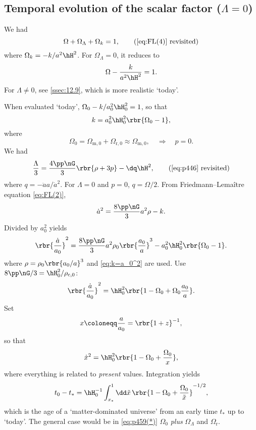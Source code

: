 \subsection{Temporal evolution of the scalar factor ($\Lambda = 0$)}
\label{ssec:12.7}
We had
\begin{equation}
\Omega + \Omega_\Lambda + \Omega_k = 1,
\tag{\ref{eq:FL(4)} revisited}
\end{equation}
where $\Omega_k = -k / a^2 \hH^2$. For $\Omega_\Lambda = 0$, it reduces to
\begin{equation}
\Omega - \frac{k}{a^2 \hH^2} = 1.
\end{equation}
For $\Lambda \neq 0$, see \cref{ssec:12.9}, which is more realistic `today'.

When evaluated `today', $\Omega_0 - k/a_0^2 \hH_0^2 = 1$, so that
\begin{equation}
k = a_0^2 \hH_0^2\rbr{\Omega_0 -1},
\label{eq:k=a_0^2}
\end{equation}
where
\begin{equation}
\Omega_0 = \Omega_{\text{m},0} + \Omega_{\text{r},0} \approx 
\Omega_{\text{m},0},\quad \Rightarrow \quad p = 0.
\end{equation}
We had
\begin{equation}
\frac{\Lambda}{3} = \frac{4\pp\nG}{3}\rbr{\rho+3p} - \dq\hH^2,
\tag{\ref{eq:p446} revisited}
\end{equation}
where $q = - \ddot{a} a / \dot{a}^2$. For $\Lambda = 0$ and $p = 0$, $q = 
\Omega / 2$. From Friedmann--Lemaître equation \eqref{eq:FL(2)},
\begin{equation}
\dot{a}^2 = \frac{8\pp\nG}{3}a^2 \rho - k.
\end{equation}
Divided by $a_0^2$ yields
\begin{equation}
\rbr{\frac{\dot{a}}{a_0}}^2 = \frac{8\pp\nG}{3}a^2 \rho_0 \rbr{\frac{a_0}{a}}^3 
- a_0^2 \hH_0^2\rbr{\Omega_0 -1}. 
\label{eq:divided-by-a02}
\end{equation}
where $\rho = \rho_0 \rbr{a_0/a}^3$ and \cref{eq:k=a_0^2} are used. Use
$8\pp\nG/3 = \hH_0^2/\rho_{\text{c},0}$:
\begin{equation}
\rbr{\frac{\dot{a}}{a_0}}^2 = \hH_0^2\rbr{1-\Omega_0+\Omega_0\frac{a_0}{a}}.
\end{equation}
Set
\begin{equation}
x \coloneqq \frac{a}{a_0} = \rbr{1+z}^{-1},
\end{equation}
so that
\begin{equation}
\dot{x}^2 = \hH_0^2 \rbr{1 - \Omega_0 + \frac{\Omega_0}{x}},
\label{eq:p459-dotx^2}
\end{equation}
where everything is related to \emph{present} values. Integration yields
\begin{equation}
t_0 - t_* = \hH_0^{-1}\int_{x_*}^1 \dd \tilde{x}\,\rbr{1-\Omega_0 + 
\frac{\Omega_0}{\tilde{x}}}^{-1/2}
\label{eq:p459(*)},
\end{equation}
which is the age of a `matter-dominated universe' from an early time $t_*$ up 
to `today'. The general case would be in \cref{eq:p459(*)} $\Omega_0$ 
\emph{plus} $\Omega_\Lambda$ and $\Omega_\text{r}$.

